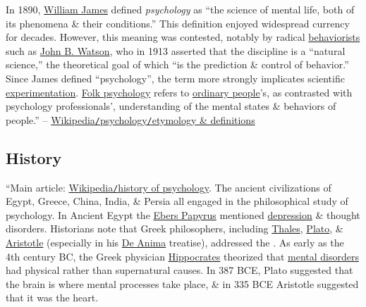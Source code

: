 \documentclass[oneside]{book}
\numberwithin{equation}{section}
\begin{document}
In 1890, \href{https://en.wikipedia.org/wiki/William_James}{William James} defined \textit{psychology} as ``the science of mental life, both of its phenomena \& their conditions.'' This definition enjoyed widespread currency for decades. However, this meaning was contested, notably by radical \href{https://en.wikipedia.org/wiki/Behaviorism}{behaviorists} such as \href{https://en.wikipedia.org/wiki/John_B._Watson}{John B. Watson}, who in 1913 asserted that the discipline is a ``natural science,'' the theoretical goal of which ``is the prediction \& control of behavior.'' Since James defined ``psychology'', the term more strongly implicates scientific \href{https://en.wikipedia.org/wiki/Experiment}{experimentation}. \href{https://en.wikipedia.org/wiki/Folk_psychology}{Folk psychology} refers to \href{https://en.wikipedia.org/wiki/Laity}{ordinary people}'s, as contrasted with psychology professionals', understanding of the mental states \& behaviors of people.'' -- \href{https://en.wikipedia.org/wiki/Psychology#Etymology_and_definitions}{Wikipedia\texttt{/}psychology\texttt{/}etymology \& definitions}

\subsection{History}
``Main article: \href{https://en.wikipedia.org/wiki/History_of_psychology}{Wikipedia\texttt{/}history of psychology}. The ancient civilizations of Egypt, Greece, China, India, \& Persia all engaged in the philosophical study of psychology. In Ancient Egypt the \href{https://en.wikipedia.org/wiki/Ebers_papyrus}{Ebers Papyrus} mentioned \href{https://en.wikipedia.org/wiki/Clinical_depression}{depression} \& thought disorders. Historians note that Greek philosophers, including \href{https://en.wikipedia.org/wiki/Thales}{Thales}, \href{https://en.wikipedia.org/wiki/Plato}{Plato}, \& \href{https://en.wikipedia.org/wiki/Aristotle}{Aristotle} (especially in his \href{https://en.wikipedia.org/wiki/On_the_Soul}{De Anima} treatise), addressed the . As early as the 4th century BC, the Greek physician \href{https://en.wikipedia.org/wiki/Hippocrates}{Hippocrates} theorized that \href{https://en.wikipedia.org/wiki/Mental_disorder}{mental disorders} had physical rather than supernatural causes. In 387 BCE, Plato suggested that the brain is where mental processes take place, \& in 335 BCE Aristotle suggested that it was the heart.
\end{document}
